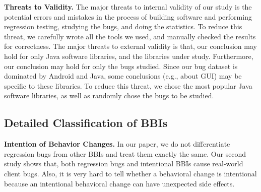 





\textbf{Threats to Validity.} The major threats to internal validity of our study is the potential errors and mistakes in the process of building software and performing regression testing, studying the bugs, and doing the statistics. To reduce this threat, we carefully wrote all the tools we used, and manually checked the results for correctness. The major threats to external validity is that, our conclusion may hold for only Java software libraries, and the libraries under study. Furthermore, our conclusion may hold for only the bugs studied. Since our bug dataset is dominated by Android and Java, some conclusions (e.g., about GUI) may be specific to these libraries. To reduce this threat, we chose the most popular Java software libraries, as well as randomly chose the bugs to be studied. 


\subsection{Detailed Classification of BBIs}

\textbf{Intention of Behavior Changes.} In our paper, we do not differentiate regression bugs from other BBIs and treat them exactly the same. Our second study shows that, both regression bugs and intentional BBIs cause real-world client bugs. Also, it is very hard to tell whether a behavioral change is intentional because an intentional behavioral change can have unexpected side effects. 



